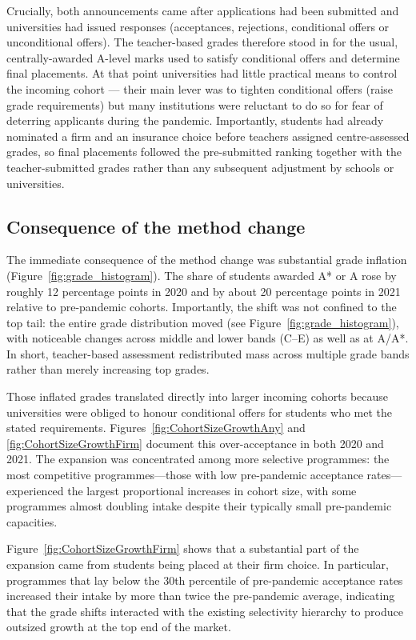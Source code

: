 Crucially, both announcements came after applications had been submitted and universities had issued responses (acceptances, rejections, conditional offers or unconditional offers). The teacher-based grades therefore stood in for the usual, centrally-awarded A-level marks used to satisfy conditional offers and determine final placements. At that point universities had little practical means to control the incoming cohort — their main lever was to tighten conditional offers (raise grade requirements) but many institutions were reluctant to do so for fear of deterring applicants during the pandemic. Importantly, students had already nominated a firm and an insurance choice before teachers assigned centre-assessed grades, so final placements followed the pre-submitted ranking together with the teacher-submitted grades rather than any subsequent adjustment by schools or universities.



\subsection{Consequence of the method change}
The immediate consequence of the method change was substantial grade inflation (Figure~\ref{fig:grade_histogram}). The share of students awarded A* or A rose by roughly 12 percentage points in 2020 and by about 20 percentage points in 2021 relative to pre-pandemic cohorts. Importantly, the shift was not confined to the top tail: the entire grade distribution moved (see Figure~\ref{fig:grade_histogram}), with noticeable changes across middle and lower bands (C–E) as well as at A/A*. In short, teacher-based assessment redistributed mass across multiple grade bands rather than merely increasing top grades.

Those inflated grades translated directly into larger incoming cohorts because universities were obliged to honour conditional offers for students who met the stated requirements. Figures~\ref{fig:CohortSizeGrowthAny} and \ref{fig:CohortSizeGrowthFirm} document this over-acceptance in both 2020 and 2021. The expansion was concentrated among more selective programmes: the most competitive programmes—those with low pre-pandemic acceptance rates—experienced the largest proportional increases in cohort size, with some programmes almost doubling intake despite their typically small pre-pandemic capacities.

Figure~\ref{fig:CohortSizeGrowthFirm} shows that a substantial part of the expansion came from students being placed at their firm choice. In particular, programmes that lay below the 30th percentile of pre-pandemic acceptance rates increased their intake by more than twice the pre-pandemic average, indicating that the grade shifts interacted with the existing selectivity hierarchy to produce outsized growth at the top end of the market.


